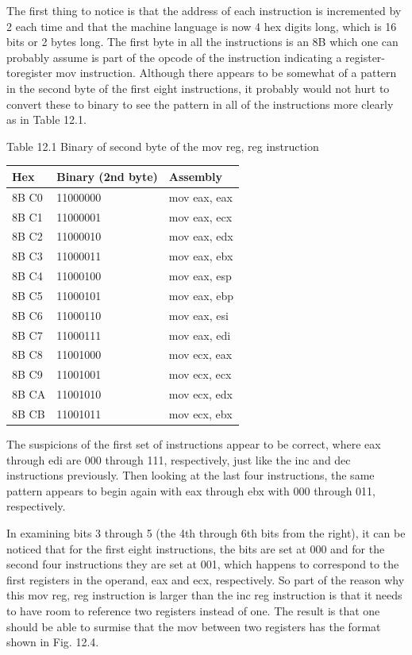 \documentclass[10pt]{book}
\begin{document}
The first thing to notice is that the address of each instruction is incremented by 2 each time and that the machine language is now 4 hex digits long, which is 16 bits or 2 bytes long. The first byte in all the instructions is an 8B which one can probably assume is part of the opcode of the instruction indicating a register-toregister mov instruction. Although there appears to be somewhat of a pattern in the second byte of the first eight instructions, it probably would not hurt to convert these to binary to see the pattern in all of the instructions more clearly as in Table 12.1.

Table 12.1 Binary of second byte of the mov reg, reg instruction

\begin{center}
\begin{tabular}{|l|l|l|}
\hline
Hex & Binary (2nd byte) & Assembly \\
\hline
8B C0 & 11000000 & mov eax, eax \\
\hline
8B C1 & 11000001 & mov eax, ecx \\
\hline
8B C2 & 11000010 & mov eax, edx \\
\hline
8B C3 & 11000011 & mov eax, ebx \\
\hline
8B C4 & 11000100 & mov eax, esp \\
\hline
8B C5 & 11000101 & mov eax, ebp \\
\hline
8B C6 & 11000110 & mov eax, esi \\
\hline
8B C7 & 11000111 & mov eax, edi \\
\hline
8B C8 & 11001000 & mov ecx, eax \\
\hline
8B C9 & 11001001 & mov ecx, ecx \\
\hline
8B CA & 11001010 & mov ecx, edx \\
\hline
8B CB & 11001011 & mov ecx, ebx \\
\hline
\end{tabular}
\end{center}

The suspicions of the first set of instructions appear to be correct, where eax through edi are 000 through 111, respectively, just like the inc and dec instructions previously. Then looking at the last four instructions, the same pattern appears to begin again with eax through ebx with 000 through 011, respectively.

In examining bits 3 through 5 (the 4th through 6th bits from the right), it can be noticed that for the first eight instructions, the bits are set at 000 and for the second four instructions they are set at 001, which happens to correspond to the first registers in the operand, eax and ecx, respectively. So part of the reason why this mov reg, reg instruction is larger than the inc reg instruction is that it needs to have room to reference two registers instead of one. The result is that one should be able to surmise that the mov between two registers has the format shown in Fig. 12.4.
\end{document}

